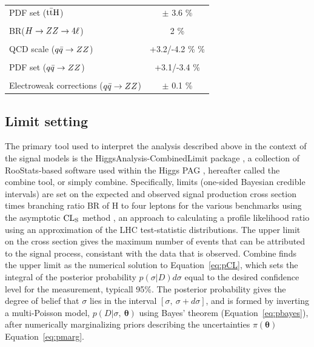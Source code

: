 \begin{table}[!htb]
\begin{center}
\begin{tabular}{|lc|}
PDF set (${\rm t\bar{t}H}$) & $\pm$ 3.6 \% \\
\vspace{-0.4cm} & \\
BR($H\to ZZ\to4\ell$) & 2 \% \\
\hline %
\vspace{-0.4cm} & \\
QCD scale ($q\bar{q}\to ZZ$) & +3.2/-4.2 \% \% \\
\vspace{-0.4cm} & \\
PDF set ($q\bar{q}\to ZZ$) & +3.1/-3.4 \% \\
\vspace{-0.4cm} & \\
Electroweak corrections ($q\bar{q}\to ZZ$) & $\pm$ 0.1 \% \\
\hline %
\hline %
\end{tabular}
\normalsize
\end{center}
\end{table}
 
\subsection{Limit setting}

The primary tool used to interpret the analysis described above in the context of the signal models is the HiggsAnalysis-CombinedLimit package \cite{combinetwiki}, a collection of RooStats-based software \cite{roostatstwiki} used within the Higgs PAG \cite{higgspagtwiki}, hereafter called the combine tool, or simply combine. Specifically, limits (one-sided Bayesian credible intervals) are set on the expected and observed signal production cross section times branching ratio BR of H to four leptons for the various benchmarks using the asymptotic $\rm{CL}_S$ method \cite{Cowan:2010js}, an approach to calculating a profile likelihood ratio using an approximation of the LHC test-statistic distributions. The upper limit on the cross section gives the maximum number of events that can be attributed to the signal process, consistant with the data that is observed. Combine finds the upper limit as the numerical solution to Equation~\ref{eq:pCL}, which sets the integral of the posterior probability $p(\sigma|D)d\sigma$ equal to the desired confidence level for the measurement, typicall 95\%. The posterior probability gives the degree of belief that $\sigma$ lies in the interval $[\sigma,\ \sigma+d\sigma]$, and is formed by inverting a multi-Poisson model, $p(D|\sigma,\ \bm{\theta})$ using Bayes' theorem (Equation~\ref{eq:pbayes}), after numerically marginalizing priors describing the uncertainties $\pi(\bm{\theta})$ Equation~\ref{eq:pmarg}.

